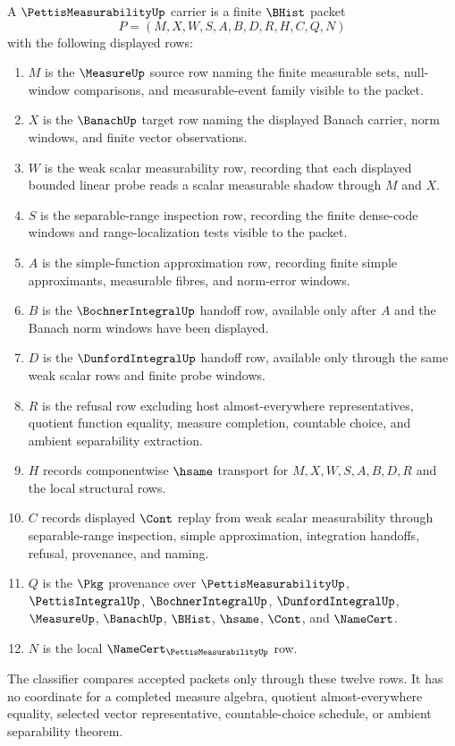 \begin{definition}
\label{def:pettis-measurability-carrier}
A $\PettisMeasurabilityUp$ carrier is a finite $\BHist$ packet
$$
P=(M,X,W,S,A,B,D,R,H,C,Q,N)
$$
with the following displayed rows:
\begin{enumerate}
\item $M$ is the $\MeasureUp$ source row naming the finite measurable sets, null-window comparisons, and measurable-event family visible to the packet.
\item $X$ is the $\BanachUp$ target row naming the displayed Banach carrier, norm windows, and finite vector observations.
\item $W$ is the weak scalar measurability row, recording that each displayed bounded linear probe reads a scalar measurable shadow through $M$ and $X$.
\item $S$ is the separable-range inspection row, recording the finite dense-code windows and range-localization tests visible to the packet.
\item $A$ is the simple-function approximation row, recording finite simple approximants, measurable fibres, and norm-error windows.
\item $B$ is the $\BochnerIntegralUp$ handoff row, available only after $A$ and the Banach norm windows have been displayed.
\item $D$ is the $\DunfordIntegralUp$ handoff row, available only through the same weak scalar rows and finite probe windows.
\item $R$ is the refusal row excluding host almost-everywhere representatives, quotient function equality, measure completion, countable choice, and ambient separability extraction.
\item $H$ records componentwise $\hsame$ transport for $M,X,W,S,A,B,D,R$ and the local structural rows.
\item $C$ records displayed $\Cont$ replay from weak scalar measurability through separable-range inspection, simple approximation, integration handoffs, refusal, provenance, and naming.
\item $Q$ is the $\Pkg$ provenance over $\PettisMeasurabilityUp$, $\PettisIntegralUp$, $\BochnerIntegralUp$, $\DunfordIntegralUp$, $\MeasureUp$, $\BanachUp$, $\BHist$, $\hsame$, $\Cont$, and $\NameCert$.
\item $N$ is the local $\NameCert_{\PettisMeasurabilityUp}$ row.
\end{enumerate}
The classifier compares accepted packets only through these twelve rows. It has no coordinate for a completed measure algebra, quotient almost-everywhere equality, selected vector representative, countable-choice schedule, or ambient separability theorem.
\end{definition}

